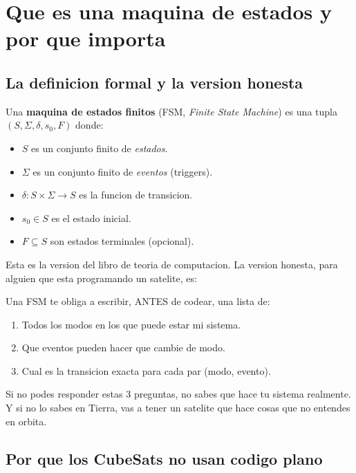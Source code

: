 \documentclass[11pt,a4paper,oneside,openright]{book}
\begin{document}
\chapter{Que es una maquina de estados y por que importa}

\section{La definicion formal y la version honesta}

Una \textbf{maquina de estados finitos} (FSM, \emph{Finite State
Machine}) es una tupla $(S, \Sigma, \delta, s_0, F)$ donde:

\begin{itemize}[leftmargin=2em]
  \item $S$ es un conjunto finito de \emph{estados}.
  \item $\Sigma$ es un conjunto finito de \emph{eventos} (triggers).
  \item $\delta: S \times \Sigma \to S$ es la funcion de transicion.
  \item $s_0 \in S$ es el estado inicial.
  \item $F \subseteq S$ son estados terminales (opcional).
\end{itemize}

Esta es la version del libro de teoria de computacion. La version
honesta, para alguien que esta programando un satelite, es:

\begin{intui}
Una FSM te obliga a escribir, ANTES de codear, una lista de:
\begin{enumerate}[leftmargin=2em]
  \item Todos los modos en los que puede estar mi sistema.
  \item Que eventos pueden hacer que cambie de modo.
  \item Cual es la transicion exacta para cada par (modo, evento).
\end{enumerate}
Si no podes responder estas 3 preguntas, no sabes que hace tu sistema
realmente. Y si no lo sabes en Tierra, vas a tener un satelite que
hace cosas que no entendes en orbita.
\end{intui}

\section{Por que los CubeSats no usan codigo plano}
\end{document}
